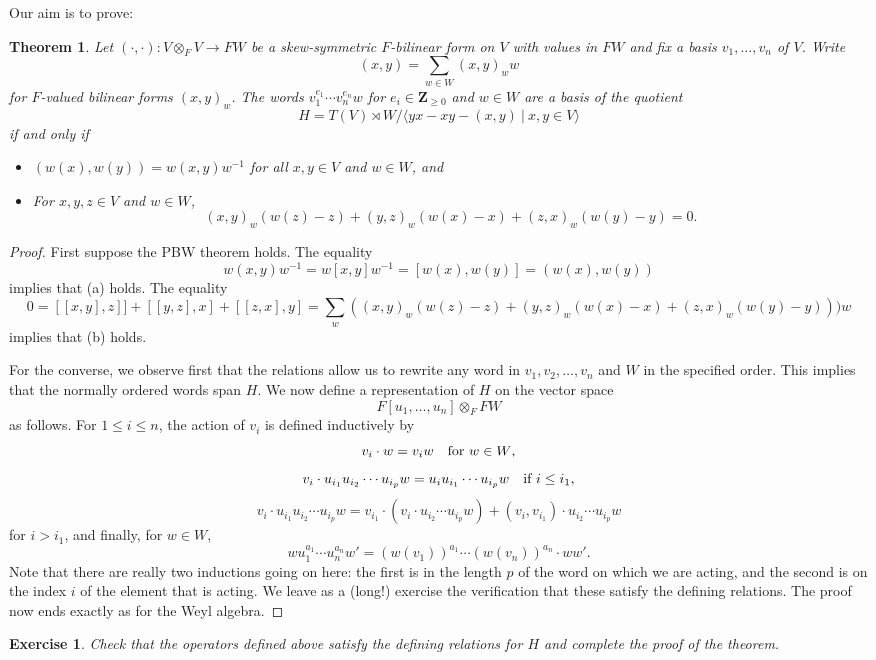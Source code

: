 \documentclass[12pt, reqno]{amsart}
\numberwithin{equation}{section}
\theoremstyle{definition}
\theoremstyle{plain}
\newtheorem{theorem}{Theorem}[section]
\newtheorem{exercise}{Exercise}
\newcommand{\ZZ}{\mathbf{Z}}
\newcommand{\la}{\langle}
\newcommand{\ra}{\rangle}
\begin{document}
Our aim is to prove:
\begin{theorem}
Let $(\cdot,\cdot): V \otimes_F V \rightarrow F W$ be a skew-symmetric $F$-bilinear form on $V$ with values in $FW$ and fix a basis $v_1,\dots,v_n$ of $V$. Write
$$(x,y)=\sum_{w \in W} (x,y)_w w$$ for $F$-valued bilinear forms $(x,y)_w$. The words $v_1^{e_1} \cdots v_n^{e_n} w$ for $e_i \in \ZZ_{\geq 0}$ and $w \in W$ are a basis of the quotient
$$H=T(V) \rtimes W / \la yx-xy-(x,y) \ | \ x,y \in V \ra$$ if and only if
\begin{itemize}
\item[(a)] $(w(x),w(y))=w (x,y) w^{-1}$ for all $x,y \in V$ and $w \in W$, and
\item[(b)] For $x,y,z \in V$ and $w \in W$,
$$(x,y)_w (w(z)-z)+(y,z)_w(w(x)-x)+(z,x)_w(w(y)-y)=0.$$
\end{itemize}	
\end{theorem}	
\begin{proof}
First suppose the PBW theorem holds. The equality
$$w (x,y) w^{-1}=w[x,y]w^{-1}=[w(x),w(y)]=(w(x),w(y))$$ implies that (a) holds. The equality
$$0=[[x,y],z]]+[[y,z],x]+[[z,x],y]=\sum_w ((x,y)_w(w(z)-z)+(y,z)_w(w(x)-x)+(z,x)_w(w(y)-y)))w$$	implies that (b) holds.

For the converse, we observe first that the relations allow us to rewrite any word in $v_1,v_2,\dots,v_n$ and $W$ in the specified order. This implies that the normally ordered words span $H$. We now define a representation of $H$ on the vector space
$$F[u_1,\dots,u_n] \otimes_F FW$$ as follows. 
For $1 \leq i \leq n$, the action of $v_i$ is defined inductively by
$$v_i \cdot w=v_i w \quad \hbox{for $w \in W$,}$$
$$v_i \cdot u_{i_1} u_{i_2} \cdots u_{i_p} w=u_i u_{i_1} \cdots u_{i_p} w \quad \hbox{if $i \leq i_1$,}$$
$$v_i \cdot u_{i_1} u_{i_2} \cdots u_{i_p} w=v_{i_1} \cdot \left(v_i \cdot u_{i_2} \cdots u_{i_p} w\right)+(v_i,v_{i_1}) \cdot u_{i_2} \cdots u_{i_p} w$$ for $i>i_1$, and finally, for $w \in W$,
$$w u_1^{a_1} \cdots u_n^{a_n} w'= (w (v_1))^{a_1} \cdots (w (v_n))^{a_n} \cdot ww'.$$ Note that there are really two inductions going on here: the first is in the length $p$ of the word on which we are acting, and the second is on the index $i$ of the element that is acting. We leave as a (long!) exercise the verification that these satisfy the defining relations. The proof now ends exactly as for the Weyl algebra.
\end{proof}
\begin{exercise}
Check that the operators defined above satisfy the defining relations for $H$ and complete the proof of the theorem.
\end{exercise}	
\end{document}
